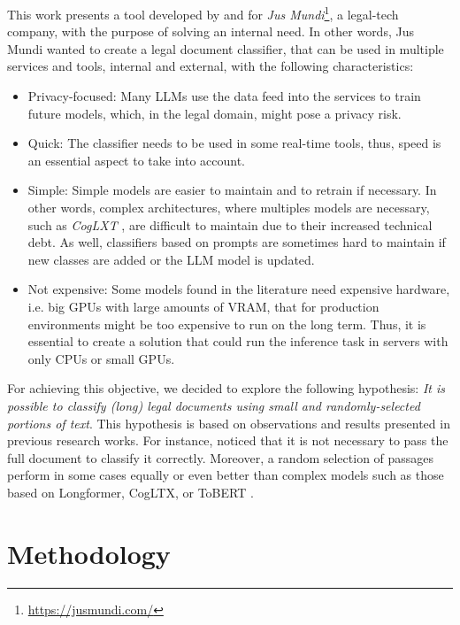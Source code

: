 \documentclass[11pt]{article}
\newcommand{\anonymize}[1]{#1}
\begin{document}
    This work presents a tool developed by and for \anonymize{\textit{Jus Mundi}}\footnote{\anonymize{\href{https://jusmundi.com/}{https://jusmundi.com/}}}, a legal-tech company, with the purpose of solving an internal need. In other words, \anonymize{Jus Mundi} wanted to create a legal document classifier, that can be used in multiple services and tools, internal and external, with the following characteristics:
    \begin{itemize}
        \item Privacy-focused: Many LLMs use the data feed into the services to train future models, which, in the legal domain, might pose a privacy risk.
        \item Quick: The classifier needs to be used in some real-time tools, thus, speed is an essential aspect to take into account.
        \item Simple: Simple models are easier to maintain and to retrain if necessary. In other words, complex architectures, where multiples models are necessary, such as \textit{CogLXT} \cite{ding_cogltx_2020}, are difficult to maintain due to their increased technical debt. As well, classifiers based on prompts are sometimes hard to maintain if new classes are added or the LLM model is updated.
        \item Not expensive: Some models found in the literature need expensive hardware, i.e. big GPUs with large amounts of VRAM, that for production environments might be too expensive to run on the long term. Thus, it is essential to create a solution that could run the inference task in servers with only CPUs or small GPUs.
    \end{itemize}

    For achieving this objective, we decided to explore the following hypothesis: \textit{It is possible to classify (long) legal documents using small and randomly-selected portions of text}. This hypothesis is based on observations and results presented in previous research works. For instance, \citet{ding_cogltx_2020,park_efficient_2022,li_dont_2023} noticed that it is not necessary to pass the full document to classify it correctly. Moreover, a random selection of passages perform in some cases equally or even better than complex models such as those based on Longformer, CogLTX, or ToBERT \cite{park_efficient_2022}.

\section{Methodology}
\label{sec: Methodology}
\end{document}
